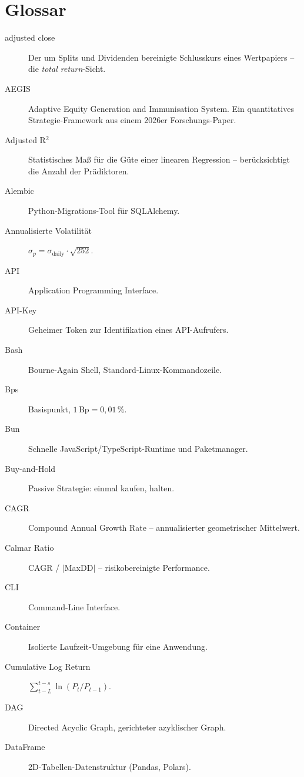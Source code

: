
\chapter{Glossar}

\label{app:glossar}

\begin{description}
  \item[adjusted close] Der um Splits und Dividenden bereinigte
        Schlusskurs eines Wertpapiers -- die \emph{total return}-Sicht.
  \item[AEGIS] Adaptive Equity Generation and Immunisation System. Ein
        quantitatives Strategie-Framework aus einem 2026er
        Forschungs-Paper.
  \item[Adjusted R$^2$] Statistisches Maß für die Güte einer
        linearen Regression -- berücksichtigt die Anzahl der
        Prädiktoren.
  \item[Alembic] Python-Migrations-Tool für SQLAlchemy.
  \item[Annualisierte Volatilität] $\sigma_p = \sigma_\text{daily} \cdot \sqrt{252}$.
  \item[API] Application Programming Interface.
  \item[API-Key] Geheimer Token zur Identifikation eines API-Aufrufers.
  \item[Bash] Bourne-Again Shell, Standard-Linux-Kommandozeile.
  \item[Bps] Basispunkt, $1\,\text{Bp} = 0{,}01\,\%$.
  \item[Bun] Schnelle JavaScript/TypeScript-Runtime und Paketmanager.
  \item[Buy-and-Hold] Passive Strategie: einmal kaufen, halten.
  \item[CAGR] Compound Annual Growth Rate -- annualisierter
        geometrischer Mittelwert.
  \item[Calmar Ratio] CAGR / $|$MaxDD$|$ -- risikobereinigte Performance.
  \item[CLI] Command-Line Interface.
  \item[Container] Isolierte Laufzeit-Umgebung für eine Anwendung.
  \item[Cumulative Log Return] $\sum_{t-L}^{t-s} \ln(P_t/P_{t-1})$.
  \item[DAG] Directed Acyclic Graph, gerichteter azyklischer Graph.
  \item[DataFrame] 2D-Tabellen-Datenstruktur (Pandas, Polars).

\end{description}
